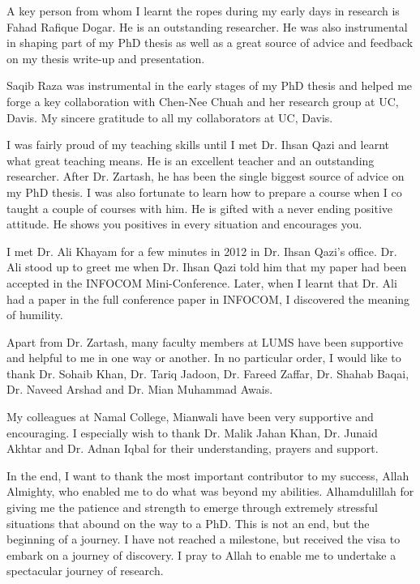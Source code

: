 A key person from whom I learnt the ropes during my early days in research is Fahad Rafique Dogar. He is an outstanding researcher. He was also instrumental in shaping part of my PhD thesis as well as a great source of advice and feedback on my thesis write-up and presentation. 


Saqib Raza was instrumental in the early stages of my PhD thesis and helped me forge a key collaboration with Chen-Nee Chuah and her research group at UC, Davis. My sincere gratitude to all my collaborators at UC, Davis. 


I was fairly proud of my teaching skills until I met Dr. Ihsan Qazi and learnt what great teaching means. He is an excellent teacher and an outstanding researcher. After Dr. Zartash, he has been the single biggest source of advice on my PhD thesis. I was also fortunate to learn how to prepare a course when I co taught a couple of courses with him. He is gifted with a never ending positive attitude. He shows you positives in every situation and encourages you. 


I met Dr. Ali Khayam for a few minutes in 2012 in Dr. Ihsan Qazi's office. Dr. Ali stood up to greet me when Dr. Ihsan Qazi told him that my paper had been accepted in the INFOCOM Mini-Conference. Later, when I learnt that Dr. Ali had a paper in the full conference paper in INFOCOM, I discovered the meaning of humility.

 
Apart from Dr. Zartash, many faculty members at LUMS have been supportive and helpful to me in one way or another. In no particular order, I would like to thank Dr. Sohaib Khan, Dr. Tariq Jadoon, Dr. Fareed Zaffar, Dr. Shahab Baqai, Dr. Naveed Arshad and Dr. Mian Muhammad Awais. 


My colleagues at Namal College, Mianwali have been very supportive and encouraging. I especially wish to thank Dr. Malik Jahan Khan, Dr. Junaid Akhtar and Dr. Adnan Iqbal for their understanding, prayers and support.


In the end, I want to thank the most important contributor to my success, Allah Almighty, who enabled me to do what was beyond my abilities. Alhamdulillah for giving me the patience and strength to emerge through extremely stressful situations that abound on the way to a PhD. This is not an end, but the beginning of a journey. I have not reached a milestone, but received the visa to embark on a journey of discovery. I pray to Allah to enable me to undertake a spectacular journey of research.